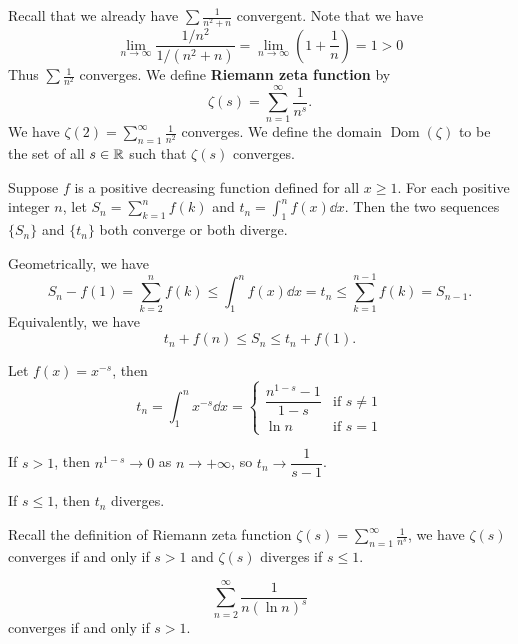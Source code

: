     \begin{exampleenv}
        Recall that we already have $\displaystyle \sum \frac{1}{n^2+n}$ convergent. Note that we have
        \[
        \lim_{n\to \infty} \frac{1/n^2}{1/(n^2+n)} = \lim_{n\to \infty} \left( 1+\frac1n \right) = 1 >0
        \]
        Thus $\displaystyle \sum \frac1{n^2}$ converges. We define \textbf{Riemann zeta function} by
        \[
        \zeta(s) = \sum_{n=1}^\infty \frac{1}{n^s}.
        \]
        We have $\zeta(2) = \displaystyle \sum_{n=1}^\infty \frac{1}{n^2}$ converges. We define the domain $\operatorname{Dom} \left( \zeta \right)$ to be the set of all $s\in \mathbb{R}$ such that $\zeta(s)$ converges.
    \end{exampleenv}
    \begin{theoremenv}
        Suppose $f$ is a positive decreasing function defined for all $x\ge 1$. For each positive integer $n$, let $S_n = \displaystyle \sum_{k=1}^n f(k)$ and $\displaystyle t_n = \int_1^n f(x)\dd x$. Then the two sequences $\{S_n\}$ and $\{t_n\}$ both converge or both diverge.

        
    \end{theoremenv}
    \begin{proofenv}
        Geometrically, we have
        \[
        S_n - f(1) = \sum_{k=2}^n f(k) \le \int_1^n f(x)\dd x = t_n \le \sum_{k=1}^{n-1} f(k) = S_{n-1}.
        \]
        Equivalently, we have
        \[
        t_n + f(n) \le S_n \le t_n + f(1).
        \]
    \end{proofenv} 
    \begin{exampleenv}
        Let $f(x) = x^{-s}$, then
        \[
        t_n = \int_1^n x^{-s} \dd x = \begin{cases}
        \dfrac{n^{1-s} - 1}{1-s} & \text{if } s\neq 1\\[6pt]
        \ln n & \text{if } s=1
        \end{cases}
        \]

        If $s>1$, then $n^{1-s} \to 0$ as $n\to +\infty$, so $t_n \to \dfrac{1}{s-1}$.

        If $s\le 1$, then $t_n$ diverges. 

        Recall the definition of Riemann zeta function $\zeta(s) = \displaystyle \sum_{n=1}^\infty \frac{1}{n^s}$, we have $\zeta(s)$ converges if and only if $s>1$ and $\zeta(s)$ diverges if $s\le 1$.
    \end{exampleenv}
    \begin{exampleenv}
        $$\displaystyle \sum_{n=2}^\infty \frac{1}{n (\ln n)^s}$$ converges if and only if $s>1$. 
    \end{exampleenv}
